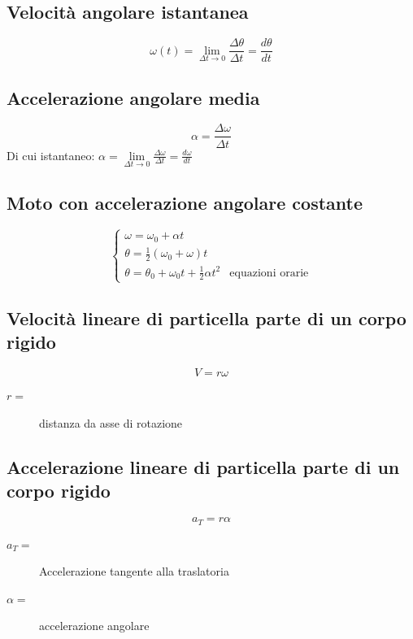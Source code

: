 \documentclass{book}
\begin{document}
\subsection{Velocità angolare istantanea}
\label{sec:velangist}

\begin{equation}
  \label{eq:velangist}
  \omega(t)=\lim\limits_{\Delta t\to 0}\frac{\Delta \theta}{\Delta t}=\frac{d\theta}{dt}
\end{equation}

\subsection{Accelerazione angolare media}
\label{sec:accangmedia}

\begin{equation}
  \label{eq:accangmedia}
  \alpha=\frac{\Delta \omega}{\Delta t}
\end{equation}
Di cui istantaneo: $\alpha=\lim\limits_{\Delta t\to 0}\frac{\Delta \omega}{\Delta t}=\frac{d\omega}{dt}$

\subsection{Moto con accelerazione angolare costante}
\label{sec:motconaccelangcost}
\begin{equation}
  \label{eq:motconaccelangcost}
  \begin{cases}
    \omega=\omega_0+\alpha t\\
    \theta= \frac{1}{2} (\omega_0+\omega)t\\
    \theta= \theta_0+\omega_0t+\frac{1}{2}\alpha t^2 & \text{equazioni orarie}
  \end{cases}
\end{equation}

\subsection{Velocità lineare di particella parte di un corpo rigido}
\label{sec:vellindipartcorprigid}
\begin{equation}
  \label{eq:vellindipartcorprigid}
  V=r\omega
\end{equation}
\begin{description}
\item[$r=$] distanza da asse di rotazione
\end{description}

\subsection{Accelerazione lineare di particella parte di un corpo rigido}
\label{sec:acclindipartcorprigid}
\begin{equation}
  \label{eq:acclindipartcorprigid}
  a_T=r \alpha
\end{equation}
\begin{description}
\item[$a_T=$] Accelerazione tangente alla traslatoria
\item[$\alpha=$] accelerazione angolare
\end{description}
\end{document}
